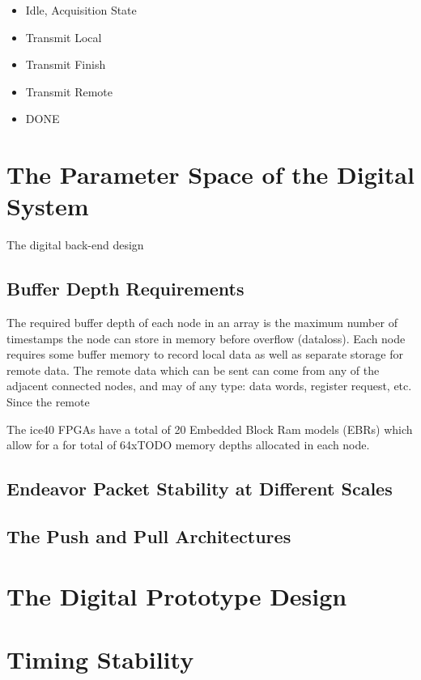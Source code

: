 \begin{itemize}
    \item Idle, Acquisition State
    \item Transmit Local
    \item Transmit Finish
    \item Transmit Remote
    \item DONE
\end{itemize}
\label{fsm_state_labels}

\section{The Parameter Space of the Digital System}

The digital back-end design

\subsection{Buffer Depth Requirements}

The required buffer depth of each node in an array is the maximum number of timestamps the node can store in memory before overflow (dataloss).
Each node requires some buffer memory to record local data as well as separate storage for remote data.
The remote data which can be sent can come from any of the adjacent connected nodes, and may of any type: data words, register request, etc.
Since the remote

The ice40 FPGAs have a total of 20 Embedded Block Ram models (EBRs) which allow for a for total of 64xTODO memory depths allocated in each node.

\subsection{Endeavor Packet Stability at Different Scales}


\subsection{The Push and Pull Architectures}

\section{The Digital Prototype Design}


\section{Timing Stability}

